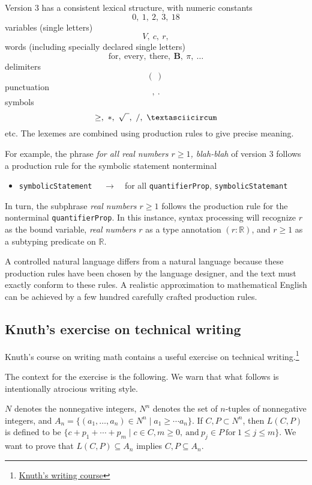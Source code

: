 \documentclass[12pt]{amsart}
\newcommand{\fld}{\textasciicircum}
\newcommand{\Real}{\ensuremath{{\mathbb R}}}
\newcommand{\h}[1]{\text{#1}}
\renewcommand{\~}{\ }
\renewcommand{\_}{\textunderscore}
\newenvironment{prule}%
               {\begin{itemize}}%
               {\end{itemize}}
\newcommand{\ptem}{\item}
\newcommand{\nt}[1]{{\tt #1}}
\newcommand{\rw}{$\quad\to\quad$}
\begin{document}
Version 3 has a consistent lexical structure, with
numeric constants
\[
0,\ 1,\ 2,\ 3,\ 18
\]
variables (single letters)
\[
V,\ c,\ r,
\]
words (including specially declared single letters)
\[
\h{for},\ \h{every},\ \h{there},\ {\mathbf B},\  \pi,\ \ldots
\]
delimiters
\[
(\ )\ 
\]
punctuation
\[
,\ .
\]
symbols
\[
\ge,\ *,\ \sqrt{\phantom{e}},\ /,\ \fld
\]
etc.  The lexemes are combined using production rules to give precise
meaning.

For example, the phrase {\it for all real numbers $r\ge1$, blah-blah}
of version 3 follows a production rule for the symbolic statement
nonterminal
\begin{prule}
  \ptem \nt{symbolicStatement} \rw for all \nt{quantifierProp}, \nt{symbolicStatemant}
\end{prule}
In turn, the subphrase {\it real numbers $r\ge1$} follows the
production rule for the nonterminal \nt{quantifierProp}.  In this
instance, syntax processing will recognize $r$ as the bound variable,
{\it real numbers $r$} as a type annotation $(r : \Real)$, and
$r\ge 1$ as a subtyping predicate on $\Real$.

A controlled natural language differs from a natural language because
these production rules have been chosen by the language designer, and
the text must exactly conform to these rules.  A realistic
approximation to mathematical English can be achieved by a few hundred
carefully crafted production rules.


\subsection{Knuth's exercise on technical writing}

Knuth's course on writing math contains a useful exercise on technical
writing.\footnote{\href{http://tex.loria.fr/typographie/mathwriting.pdf}{Knuth's
    writing course}}

The context for the exercise is the following.  We warn that what
follows is intentionally atrocious writing style.

$N$ denotes the nonnegative integers, $N^n$ denotes the set of
$n$-tuples of nonnegative integers, and $A_n = \{(a_1,\ldots,a_n)\in
N^n\mid a_1 \ge \cdots a_n\}.$ If $C,P\subset N^n$, then $L(C,P)$ is
defined to be $\{c + p_1 +\cdots + p_m\mid c\in C, m\ge
0,\ \h{and}\ p_j\in P\ \h{for}\ 1\le j\le m\}.  $ We want to prove
that $L(C,P)\subseteq A_n$ implies $C,P\subseteq A_n$.
\end{document}
